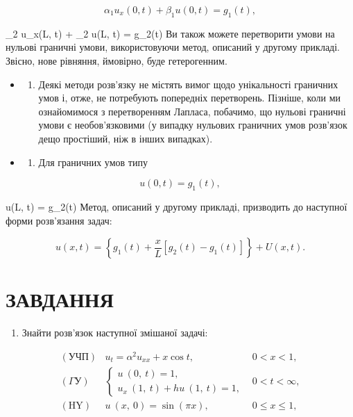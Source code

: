\documentclass[
  ukrainian,
]{article}
\providecommand{\tightlist}{%
  \setlength{\itemsep}{0pt}\setlength{\parskip}{0pt}}
\begin{document}
\[
\alpha_1 u_x(0, t) + \beta_1 u(0, t) = g_1(t),
\]

\alpha\_2 u\_x(L, t) + \beta\_2 u(L, t) = g\_2(t) Ви також можете
перетворити умови на нульові граничні умови, використовуючи метод,
описаний у другому прикладі. Звісно, нове рівняння, ймовірно, буде
гетерогенним.

\begin{itemize}
\tightlist
\item
  \begin{enumerate}
  \def\labelenumi{\arabic{enumi}.}
  \setcounter{enumi}{2}
  \tightlist
  \item
    Деякі методи розв'язку не містять вимог щодо унікальності граничних
    умов і, отже, не потребують попередніх перетворень. Пізніше, коли ми
    ознайомимося з перетворенням Лапласа, побачимо, що нульові граничні
    умови є необов'язковими (у випадку нульових граничних умов розв'язок
    дещо простіший, ніж в інших випадках).
  \end{enumerate}
\item
  \begin{enumerate}
  \def\labelenumi{\arabic{enumi}.}
  \setcounter{enumi}{3}
  \tightlist
  \item
    Для граничних умов типу
  \end{enumerate}
\end{itemize}

\[
u(0, t) = g_1(t),
\]

u(L, t) = g\_2(t) Метод, описаний у другому прикладі, призводить до
наступної форми розв'язання задач:

\[
u(x, t) = \left\{ g_1(t) + \frac{x}{L} \left[ g_2(t) - g_1(t) \right] \right\} + U(x, t).
\]

\section{ЗАВДАННЯ}\label{ux437ux430ux432ux434ux430ux43dux43dux44f-3}

\begin{enumerate}
\def\labelenumi{\arabic{enumi}.}
\tightlist
\item
  Знайти розв'язок наступної змішаної задачі:
\end{enumerate}

\[
\begin{aligned} (\text{УЧП}) & u_t = \alpha^2 u_{xx} + x \cos t, & 0 < x < 1, \\ (\Gamma \text{У}) & \begin{cases} u \ (0, \ t) = 1, \\ u_x \ (1, \ t) + hu \ (1, \ t) = 1, \end{cases} & 0 < t < \infty, \\ (\text{HY}) & u \ (x, \ 0) = \sin (\pi x), & 0 \leqslant x \leqslant 1, \end{aligned}
\]
\end{document}
